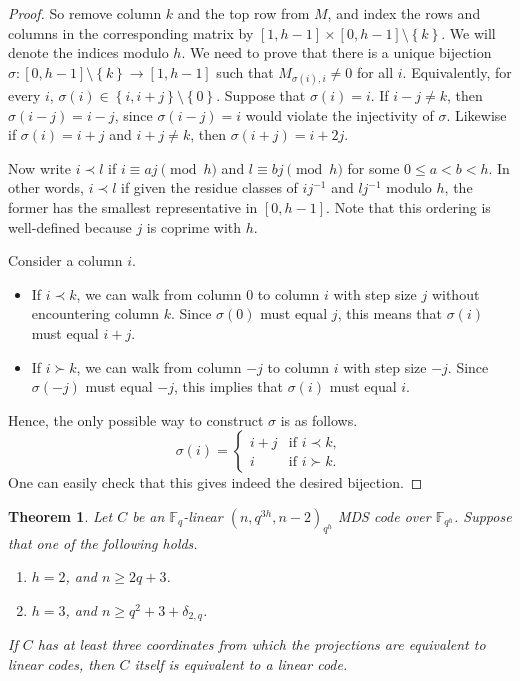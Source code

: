 \documentclass[a4paper]{article}
\newtheorem{thm}{Theorem}[section]
\theoremstyle{definition}
\newcommand{\FF}{\mathbb F}
\newcommand{\set}[1]{ \left \{ #1 \right \} }
\begin{document}
\begin{proof}
So remove column $k$ and the top row from $M$, and index the rows and columns in the corresponding matrix by $[1,h-1] \times [0,h-1] \setminus \set k$.
We will denote the indices modulo $h$.
We need to prove that there is a unique bijection $\sigma: [0,h-1] \setminus \set k \to [1,h-1]$ such that $M_{\sigma(i),i} \neq 0$ for all $i$.
Equivalently, for every $i$, $\sigma(i) \in \set{i,i+j} \setminus \set 0$.
Suppose that $\sigma(i) = i$.
If $i-j \neq k$, then $\sigma(i-j) = i-j$, since $\sigma(i-j) = i$ would violate the injectivity of $\sigma$.
Likewise if $\sigma(i) = i+j$ and $i+j \neq k$, then $\sigma(i+j) = i+2j$.

Now write $i \prec l$ if $i \equiv a j \pmod h$ and $l \equiv b j \pmod h$ for some $0 \leq a < b < h$.
In other words, $i \prec l$ if given the residue classes of $i j^{-1}$ and $l j^{-1}$ modulo $h$, the former has the smallest representative in $[0,h-1]$.
Note that this ordering is well-defined because $j$ is coprime with $h$.

Consider a column $i$.
\begin{itemize}
 \item If $i \prec k$, we can walk from column 0 to column $i$ with step size $j$ without encountering column $k$.
 Since $\sigma(0)$ must equal $j$, this means that $\sigma(i)$ must equal $i+j$.
 \item If $i \succ k$, we can walk from column $-j$ to column $i$ with step size $-j$.
 Since $\sigma(-j)$ must equal $-j$, this implies that $\sigma(i)$ must equal $i$.
\end{itemize}
Hence, the only possible way to construct $\sigma$ is as follows.
\[
 \sigma(i) = \begin{cases}
  i+j & \text{if } i \prec k, \\
  i & \text{if } i \succ k.
 \end{cases}
\]
One can easily check that this gives indeed the desired bijection.
\end{proof}

\begin{thm}
 Let $C$ be an $\FF_q$-linear $(n,q^{3h},n-2)_{q^h}$ MDS code over $\FF_{q^h}$.
 Suppose that one of the following holds.
 \begin{enumerate}
  \item $h=2$, and $n \geq 2q+3$.
  \item $h=3$, and $n \geq q^2 + 3 + \delta_{2,q}$.
 \end{enumerate}
 If $C$ has at least three coordinates from which the projections are equivalent to linear codes, then $C$ itself is equivalent to a linear code.
\end{thm}
\end{document}
